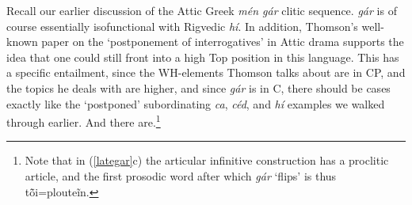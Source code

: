 \documentclass[output=paper,
modfonts
]{LSP/langsci}
\begin{document}
Recall our earlier discussion of the Attic Greek \textit{mén gár} clitic sequence. \textit{gár} is of course essentially
isofunctional with Rigvedic \textit{hí}. In addition, Thomson's \citeyearpar{thomson1939} well-known paper on the `postponement of
interrogatives' in Attic drama supports
the idea that one could still front into a high Top position in this language. This has a specific
entailment, since the WH-elements Thomson talks about are in CP, and the topics he deals with are higher, and
since \textit{gár} is in C, there should be  cases exactly like the `postponed' subordinating \textit{ca},
\textit{céd}, and \textit{hí} examples we walked through earlier. And there are.\footnote{Note that in (\ref{lategar}c)
the articular infinitive construction has a proclitic article, and the first prosodic word after which
\textit{gár} `flips' is thus tō̃i=plouteĩn.}


\end{document}

